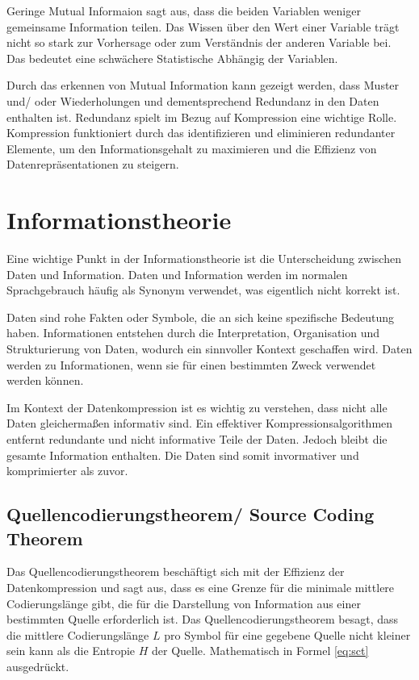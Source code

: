 \documentclass[conference]{IEEEtran}
\begin{document}
Geringe Mutual Informaion sagt aus, dass die beiden Variablen weniger gemeinsame
Information teilen.
Das Wissen über den Wert einer Variable trägt nicht so stark zur
Vorhersage oder zum Verständnis der anderen Variable bei.
Das bedeutet eine schwächere Statistische Abhängig der Variablen.

Durch das erkennen von Mutual Information kann gezeigt werden, dass Muster und/ oder
Wiederholungen und dementsprechend Redundanz in den Daten enthalten ist.
Redundanz spielt im Bezug auf Kompression eine wichtige Rolle.
Kompression funktioniert durch das identifizieren und eliminieren redundanter Elemente,
um den Informationsgehalt zu maximieren und die Effizienz von Datenrepräsentationen
zu steigern.


\section{Informationstheorie}

Eine wichtige Punkt in der Informationstheorie ist die Unterscheidung
zwischen Daten und Information.
Daten und Information werden im normalen Sprachgebrauch häufig als Synonym verwendet,
was eigentlich nicht korrekt ist.

Daten sind rohe Fakten oder Symbole, die an sich keine spezifische Bedeutung haben.
Informationen entstehen durch die Interpretation, Organisation und Strukturierung
von Daten, wodurch ein sinnvoller Kontext geschaffen wird. \cite{pieper}
Daten werden zu Informationen, wenn sie für einen bestimmten Zweck verwendet werden können.

Im Kontext der Datenkompression ist es wichtig zu verstehen, dass nicht alle Daten
gleichermaßen informativ sind.
Ein effektiver Kompressionsalgorithmen entfernt redundante
und nicht informative Teile der Daten.
Jedoch bleibt die gesamte Information enthalten.
Die Daten sind somit invormativer und komprimierter als zuvor.

\subsection{Quellencodierungstheorem/ Source Coding Theorem}

Das Quellencodierungstheorem beschäftigt sich mit der Effizienz der Datenkompression
und sagt aus, dass es eine Grenze für die minimale mittlere Codierungslänge gibt,
die für die Darstellung von Information aus einer bestimmten Quelle erforderlich
ist. \cite{sharma}
Das Quellencodierungstheorem besagt, dass die mittlere Codierungslänge $L$ pro Symbol
für eine gegebene Quelle nicht kleiner sein kann als die Entropie $H$ der Quelle.
Mathematisch in Formel \ref{eq:sct} ausgedrückt.
\end{document}
